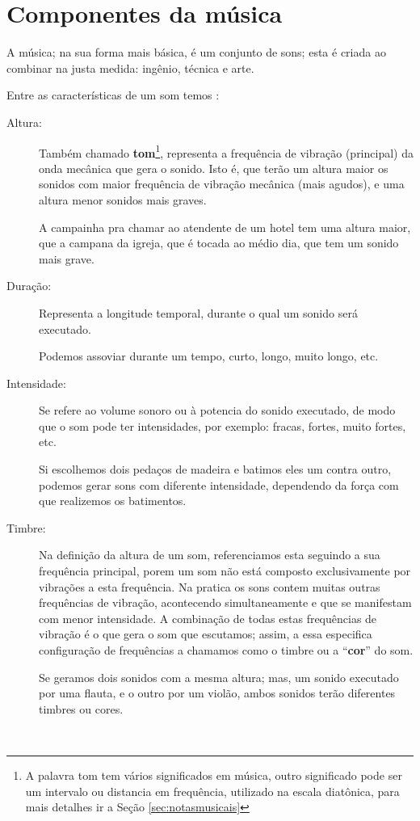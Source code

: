 
\section{Componentes da música}

A música; na sua forma mais básica,  é um conjunto de sons; esta é criada ao combinar na justa medida: 
ingênio, técnica e arte.

Entre as características de um som temos \cite[pp. 12]{medteoria} :
\begin{description}
\item [Altura:] \label{sec:pos:Altura} 
Também chamado \textbf{tom}\footnote{A palavra tom tem vários significados em música, 
outro significado pode ser um intervalo ou distancia em frequência, 
utilizado na escala diatônica, para mais detalhes ir a Seção \ref{sec:notasmusicais}}, representa a frequência de vibração (principal) da onda mecânica que gera o sonido.
Isto é, que terão um altura maior os sonidos com maior frequência de vibração mecânica (mais agudos), 
e uma altura menor sonidos mais graves.
\begin{example}
A campainha pra chamar ao atendente de um hotel tem uma altura maior,
que a campana da igreja, que é tocada ao médio dia, que tem um sonido mais grave.
\end{example} 
\item [Duração:] \label{sec:pos:Duracion}
Representa a longitude temporal, durante o qual um sonido será executado.
\begin{example}
Podemos assoviar durante um tempo, curto, longo, muito longo, etc.
\end{example} 
\item [Intensidade:] \label{sec:pos:Intensidade}
Se refere ao volume sonoro ou à potencia do sonido executado, 
de modo que o som pode ter intensidades, por exemplo: fracas, fortes, muito fortes, etc.  
\begin{example}
Si escolhemos dois pedaços de madeira e batimos eles um contra outro, 
podemos gerar sons com diferente intensidade, dependendo da força com que realizemos os batimentos.
\end{example} 
\item [Timbre:] \label{sec:pos:timbre}
Na definição da altura de um som, referenciamos esta seguindo a sua frequência principal,
porem um som não está composto exclusivamente por vibrações a esta frequência.
Na pratica os sons contem muitas outras frequências de vibração, acontecendo simultaneamente e 
que se manifestam com menor intensidade.
A combinação de todas estas frequências de vibração é o que gera o som que escutamos;
assim, a essa especifica configuração de frequências a chamamos como o timbre ou
a ``\textbf{cor}'' do som.
\begin{example}
Se geramos dois sonidos com a mesma altura; mas, um sonido executado por uma flauta,
e o outro por um violão, ambos sonidos terão diferentes timbres ou cores.
\end{example} 
\end{description}
~\\

